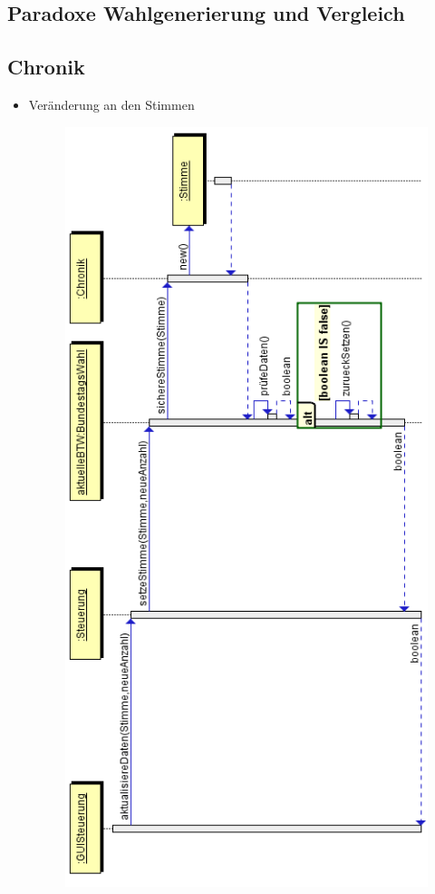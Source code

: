 \documentclass[12pt,a4paper,titlepage]{article}
\begin{document}
\newpage
\subsection{Paradoxe Wahlgenerierung und Vergleich}

\newpage
\subsection{Chronik}
\begin{itemize}
	\item Veränderung an den Stimmen \\
	\begin{figure}
	\centering
	\includegraphics[scale=0.7]{Sequenzdiagramme/Chronik_Sequenzdiagramm-stimmenaendern.png}

\end{figure}
\end{itemize}
\end{document}
